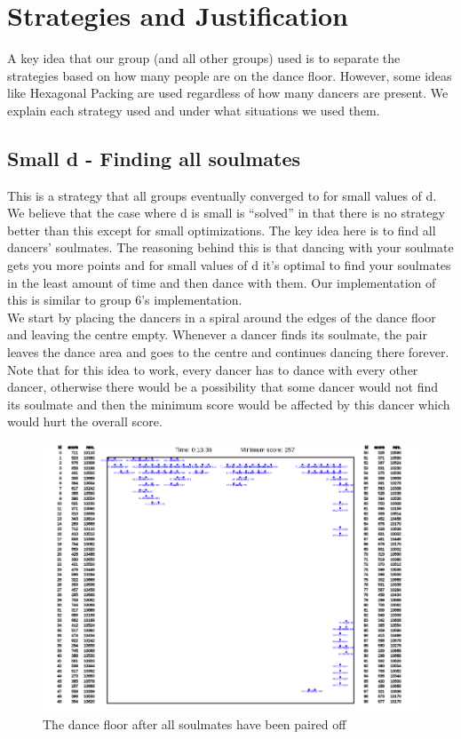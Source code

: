 \section{Strategies and Justification}
A key idea that our group (and all other groups) used is to separate the strategies based on how many people are on the dance floor. However, some ideas like Hexagonal Packing are used regardless of how many dancers are present. We explain each strategy used and under what situations we used them.
\subsection{Small d - Finding all soulmates}
This is a strategy that all groups eventually converged to for small values of d. We believe that the case where d is small is “solved” in that there is no strategy better than this except for small optimizations. The key idea here is to find all dancers' soulmates. The reasoning behind this is that dancing with your soulmate gets you more points and for small values of d it's optimal to find your soulmates in the least amount of time and then dance with them. Our implementation of this is similar to group 6's implementation.\\
We start by placing the dancers in a spiral around the edges of the dance floor and leaving the centre empty. Whenever a dancer finds its soulmate, the pair leaves the dance area and goes to the centre and continues dancing there forever. \\
Note that for this idea to work, every dancer has to dance with every other dancer, otherwise there would be a possibility that some dancer would not find its soulmate and then the minimum score would be affected by this dancer which would hurt the overall score. \\
\begin{figure}[h]
\center
\includegraphics[scale=0.5]{soulmatesfound.png}
\caption{The dance floor after all soulmates have been paired off}
\label{fig:soulmates found}
\end{figure}

